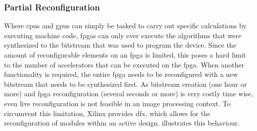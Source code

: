 \documentclass{scrartcl}
\begin{document}
\subsubsection{Partial Reconfiguration}

Where \glspl{cpu} and \glspl{gpu} can simply be tasked to carry out specific
calculations by executing machine code, \glspl{fpga} can only ever execute the
algorithms that were synthesized to the bitstream that was used to program the
device. Since the amount of reconfigurable elements on an \gls{fpga} is limited,
this poses a hard limit to the number of accelerators that can be executed on
the \gls{fpga}. When another functionality is required, the entire \gls{fpga}
needs to be reconfigured with a new bitstream that needs to be synthesized
first. As bitstream creation (one hour or more) and \gls{fpga} reconfiguration
(several seconds or more) is very costly time wise, even live reconfiguration is
not feasible in an image processing context. To circumvent this limitation,
Xilinx provides \gls{dfx}, which allows for the reconfiguration of modules
within an active design.  illustrates this behaviour.
\end{document}
